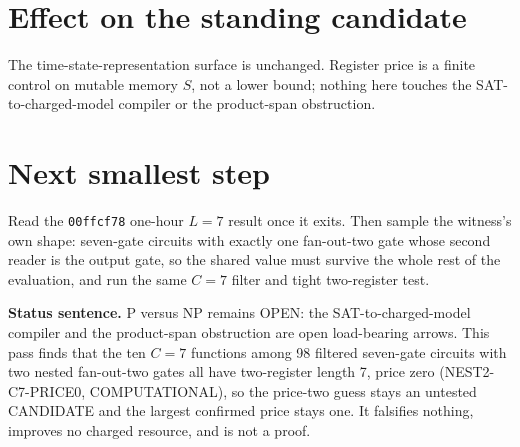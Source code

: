 \documentclass[11pt]{article}
\begin{document}
\section*{Effect on the standing candidate}
The time-state-representation surface is unchanged. Register price is a finite control on mutable memory $S$, not a lower bound; nothing here touches the SAT-to-charged-model compiler or the product-span obstruction.

\section*{Next smallest step}
Read the \texttt{00ffcf78} one-hour $L=7$ result once it exits. Then sample the witness's own shape: seven-gate circuits with exactly one fan-out-two gate whose second reader is the output gate, so the shared value must survive the whole rest of the evaluation, and run the same $C=7$ filter and tight two-register test.

\bigskip
\noindent\textbf{Status sentence.} P versus NP remains OPEN: the SAT-to-charged-model compiler and the product-span obstruction are open load-bearing arrows. This pass finds that the ten $C=7$ functions among 98 filtered seven-gate circuits with two nested fan-out-two gates all have two-register length 7, price zero (NEST2-C7-PRICE0, COMPUTATIONAL), so the price-two guess stays an untested CANDIDATE and the largest confirmed price stays one. It falsifies nothing, improves no charged resource, and is not a proof.
\end{document}
